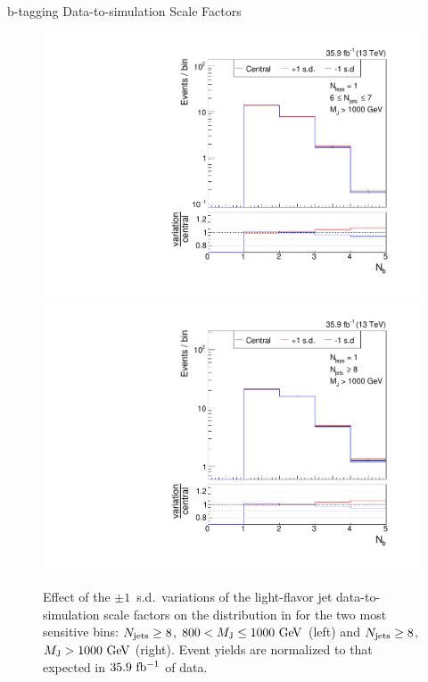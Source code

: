 \begin{section}{b-tagging Data-to-simulation Scale Factors}
\begin{figure}[tbp!]
\begin{center}
\includegraphics[angle=0,width=0.45\columnwidth]{fig/bin20_ttbar_btag_udsg_mconly.pdf}
\includegraphics[angle=0,width=0.45\columnwidth]{fig/bin21_ttbar_btag_udsg_mconly.pdf}
\end{center}
\caption{Effect of the $\pm 1$~s.d.\ variations of the light-flavor jet data-to-simulation scale factors on the \Nb distribution in \ttbar for the two most sensitive bins: $N_{\mathrm{jets}} \geq 8$, $800 < M_{\mathrm{J}} \leq 1000~\mathrm{Ge\kern -0.1em V}$ (left) and $N_{\mathrm{jets}} \geq 8$, $M_{\mathrm{J}} > 1000~\mathrm{Ge\kern -0.1em V}$ (right).
Event yields are normalized to that expected in $35.9~\mathrm{fb^{-1}}$ of data.}
\label{fig:sf_udsg_variations}
\end{figure}

\end{section}

